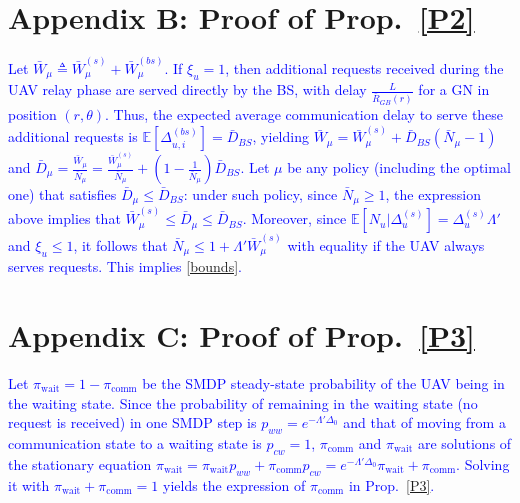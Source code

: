 \documentclass[12pt, draftcls, onecolumn]{IEEEtran}
\theoremstyle{plain}
\theoremstyle{definition}
\theoremstyle{remark}
\newcommand\hlt[1]{\textcolor{blue}{#1}}
\begin{document}
\begin{appendices}
\section*{Appendix B: Proof of Prop.~\ref{P2}}\label{X2}
\hlt{Let $\bar{W}_{\mu}{\triangleq}\bar{W}_{\mu}^{(s)}{+}\bar{W}_{\mu}^{(bs)}$. If $\xi_{u}{=}1$, then additional requests received during the UAV relay phase are served directly by the BS, with delay $\frac{L}{\bar{R}_{GB}(r)}$ for a GN in position $(r,\theta)$. Thus, the expected average communication delay to serve these additional requests is $\mathbb{E}[\Delta_{u,i}^{(bs)}]{=}\bar{D}_{BS}$, yielding $\bar{W}_{\mu}{=}\bar{W}_{\mu}^{(s)}{+}\bar{D}_{BS}(\bar{N}_{\mu}{-}1)$ and $\bar{D}_{\mu}{=}\frac{\bar{W}_{\mu}}{\bar{N}_{\mu}}{=}\frac{\bar{W}_{\mu}^{(s)}}{\bar{N}_{\mu}}{+}\left(1{-}\frac{1}{\bar N_{\mu}}\right)\bar{D}_{BS}$. Let $\mu$ be any policy (including the optimal one) that satisfies $\bar{D}_{\mu}{\leq}\bar{D}_{BS}$: under such policy, since $\bar{N}_{\mu}{\geq}1$, the expression above implies that $\bar{W}_{\mu}^{(s)}{\leq}\bar{D}_{\mu}{\leq}\bar{D}_{BS}$. Moreover, since $\mathbb{E}[N_{u}|\Delta_{u}^{(s)}]{=}\Delta_{u}^{(s)}\Lambda'$ and $\xi_{u}{\leq}1$, it follows that $\bar{N}_{\mu}{\leq}1{+}\Lambda'\bar{W}_{\mu}^{(s)}$ with equality if the UAV always serves requests. This implies \eqref{bounds}.}
\vspace{-4mm}

\section*{Appendix C: Proof of Prop.~\ref{P3}}\label{X3}
\hlt{Let $\pi_{\mathrm{wait}}{=}1{-}\pi_{\mathrm{comm}}$ be the SMDP steady-state probability of the UAV being in the waiting state. Since the probability of remaining in the waiting state (no request is received) in one SMDP step is $p_{ww}{=}e^{-\Lambda'\Delta_{0}}$ and that of moving from a communication state to a waiting state is $p_{cw}{=}1$, $\pi_{\mathrm{comm}}$ and $\pi_{\mathrm{wait}}$ are solutions of the stationary equation
$\pi_{\mathrm{wait}} = \pi_{\mathrm{wait}}p_{ww} + \pi_{\mathrm{comm}}p_{cw}= e^{-\Lambda' \Delta_0}\pi_{\mathrm{wait}} + \pi_{\mathrm{comm}}$.
Solving it with $\pi_{\mathrm{wait}}{+}\pi_{\mathrm{comm}}{=}1$ yields the expression of $\pi_{\mathrm{comm}}$ in Prop.~\ref{P3}.}
\end{appendices}
\vspace{-12mm}


 
\clearpage
\end{document}
